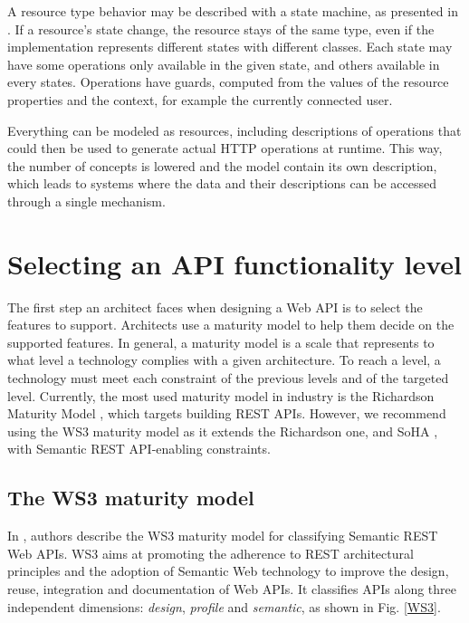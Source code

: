 
A resource type behavior may be described with a state machine, as presented in \cite{Schreier:2011:MRA:1967428.1967434}. If a resource's state change, the resource stays of the same type, even if the implementation represents different states with different classes. Each state may have some operations only available in the given state, and others available in every states. Operations have guards, computed from the values of the resource properties and the context, for example the currently connected user.

Everything can be modeled as resources, including descriptions of operations that could then be used to generate actual HTTP operations at runtime. This way, the number of concepts is lowered and the model contain its own description, which leads to systems where the data and their descriptions can be accessed through a single mechanism.

\section{Selecting an API functionality level}\label{sec:maturityLevel}

The first step an architect faces when designing a Web API is to select the features to support.
Architects use a maturity model to help them decide on the supported features. In general, a maturity model is a scale that represents to what level a technology complies with a given architecture. To reach a level, a technology must meet each constraint of the previous levels and of the targeted level.
Currently, the most used maturity model in industry is the Richardson Maturity Model \cite{RichardsonMaturityModel}, which targets building REST APIs. However, we recommend using the WS3 maturity model \cite{7195633} as it extends the Richardson one, and SoHA \cite{SoHA}, with Semantic REST API-enabling constraints.

\subsection{The WS3 maturity model}

In \cite{7195633}, authors describe the WS3 maturity model for classifying Semantic REST Web APIs. WS3 aims at promoting the adherence to REST architectural principles and the adoption of Semantic Web technology to improve the design, reuse, integration and documentation of Web APIs. It classifies APIs along three independent dimensions: \textit{design}, \textit{profile} and \textit{semantic}, as shown in Fig. \ref{WS3}.

